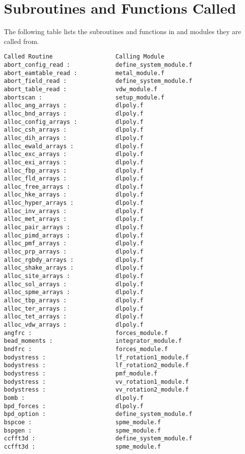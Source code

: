 \section*{Subroutines and Functions Called}

The following table lists the subroutines and functions in \D{} and
modules they are called from.

\begin{verbatim}
Called Routine                  Calling Module
abort_config_read :             define_system_module.f
abort_eamtable_read :           metal_module.f
abort_field_read :              define_system_module.f
abort_table_read :              vdw_module.f
abortscan :                     setup_module.f
alloc_ang_arrays :              dlpoly.f
alloc_bnd_arrays :              dlpoly.f
alloc_config_arrays :           dlpoly.f
alloc_csh_arrays :              dlpoly.f
alloc_dih_arrays :              dlpoly.f
alloc_ewald_arrays :            dlpoly.f
alloc_exc_arrays :              dlpoly.f
alloc_exi_arrays :              dlpoly.f
alloc_fbp_arrays :              dlpoly.f
alloc_fld_arrays :              dlpoly.f
alloc_free_arrays :             dlpoly.f
alloc_hke_arrays :              dlpoly.f
alloc_hyper_arrays :            dlpoly.f
alloc_inv_arrays :              dlpoly.f
alloc_met_arrays :              dlpoly.f
alloc_pair_arrays :             dlpoly.f
alloc_pimd_arrays :             dlpoly.f
alloc_pmf_arrays :              dlpoly.f
alloc_prp_arrays :              dlpoly.f
alloc_rgbdy_arrays :            dlpoly.f
alloc_shake_arrays :            dlpoly.f
alloc_site_arrays :             dlpoly.f
alloc_sol_arrays :              dlpoly.f
alloc_spme_arrays :             dlpoly.f
alloc_tbp_arrays :              dlpoly.f
alloc_ter_arrays :              dlpoly.f
alloc_tet_arrays :              dlpoly.f
alloc_vdw_arrays :              dlpoly.f
angfrc :                        forces_module.f
bead_moments :                  integrator_module.f
bndfrc :                        forces_module.f
bodystress :                    lf_rotation1_module.f
bodystress :                    lf_rotation2_module.f
bodystress :                    pmf_module.f
bodystress :                    vv_rotation1_module.f
bodystress :                    vv_rotation2_module.f
bomb :                          dlpoly.f
bpd_forces :                    dlpoly.f
bpd_option :                    define_system_module.f
bspcoe :                        spme_module.f
bspgen :                        spme_module.f
ccfft3d :                       define_system_module.f
ccfft3d :                       spme_module.f

\end{verbatim}
